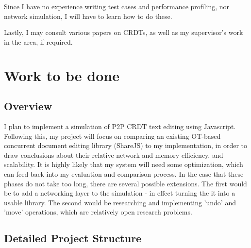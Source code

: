 \documentclass[12pt,a4paper,twoside]{article}
\begin{document}
Since I have no experience writing test cases and performance profiling, nor network simulation, 
I will have to learn how to do these.

Lastly, I may consult various papers on CRDTs, as well as my supervisor's work in the area, if required.

\section*{Work to be done}

\subsection*{Overview}
I plan to implement a simulation of P2P CRDT text editing using Javascript. Following this, my project will focus on
comparing an existing OT-based concurrent document editing library (ShareJS) to my implementation, in order to draw conclusions
about their relative network and memory efficiency, and scalability. It is highly likely that my 
system will need some optimization, which can feed back into my evaluation and comparison process. In the case that
these phases do not take too long, there are several possible extensions. The first would be to add
a networking layer to the simulation - in effect turning the it into a usable library. The second would be
researching and implementing 'undo' and 'move' operations, which are relatively open research problems.

\subsection*{Detailed Project Structure}
\end{document}
